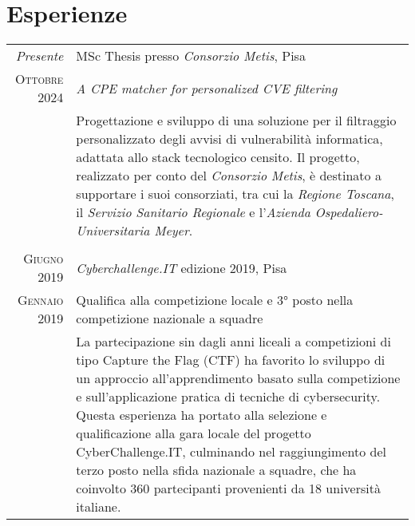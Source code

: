 \documentclass[a4paper,11pt]{article} %
\begin{document}
\section{Esperienze}

\begin{tabular}{r|p{11cm}}
\emph{Presente} & MSc Thesis presso \emph{Consorzio Metis}, Pisa\\
\textsc{Ottobre 2024} & \emph{A CPE matcher for personalized CVE filtering}\\ 
& \footnotesize{Progettazione e sviluppo di una soluzione per il filtraggio personalizzato degli avvisi di vulnerabilità informatica, adattata allo stack tecnologico censito. Il progetto, realizzato per conto del \emph{Consorzio Metis}, è destinato a supportare i suoi consorziati, tra cui la \emph{Regione Toscana}, il \emph{Servizio Sanitario Regionale} e l’\emph{Azienda Ospedaliero-Universitaria Meyer}.}\\
\multicolumn{2}{c}{} \\
%
%
\textsc{Giugno 2019} & \emph{Cyberchallenge.IT} edizione 2019, Pisa\\
\textsc{Gennaio 2019} & Qualifica alla competizione locale e 3° posto nella competizione nazionale a squadre\\ 
& \footnotesize{La partecipazione sin dagli anni liceali a competizioni di tipo Capture the Flag (CTF) ha favorito lo sviluppo di un approccio all’apprendimento basato sulla competizione e sull’applicazione pratica di tecniche di cybersecurity. Questa esperienza ha portato alla selezione e qualificazione alla gara locale del progetto CyberChallenge.IT, culminando nel raggiungimento del terzo posto nella sfida nazionale a squadre, che ha coinvolto 360 partecipanti provenienti da 18 università italiane.}\\
%
%
%
%
\end{tabular}
\end{document}
